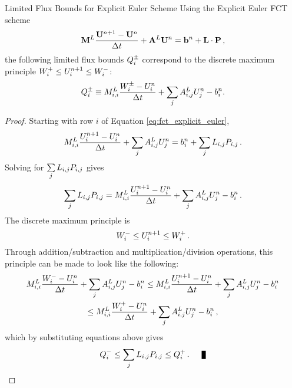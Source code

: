 \begin{theorem}{Limited Flux Bounds for Explicit Euler Scheme}
   Using the Explicit Euler FCT scheme
   \begin{equation}
     \lumpedmassmatrix\frac{\solutionvector^{\timeindex+1}
       - \solutionvector^\timeindex}{\timestepsize}
       + \loworderssmatrix\solutionvector^\timeindex
       = \ssrhs^\timeindex + \limitedfluxsum \eqc
   \end{equation}
   the following limited flux bounds $Q_i^\pm$ correspond to the
   discrete maximum principle
   $W_i^+\le U_i^{n+1}\le W_i^-$:
   \begin{equation}\label{eq:limited_flux_bounds_explicit_euler}
     Q_i^\pm \equiv M^L_{i,i}
       \frac{W_i^\pm-U_i^n}{\Delta t}
     + \sum\limits_j A_{i,j}^L U_j^n
     - b_i^n.
   \end{equation}
\end{theorem}

\begin{proof}
   Starting with row $i$ of Equation \eqref{eq:fct_explicit_euler},
   \[
     \lumpedmassentry\frac{\solutionletter_i^{\timeindex+1}
       - \solutionletter_i^\timeindex}{\timestepsize}
     + \sumj \ssmatrixletter\ij^L \solutionletter_j^\timeindex
     = \ssrhsletter_i^\timeindex
       + \sumj \limiterletter\ij\MakeUppercase{\correctionfluxletter}\ij \eqp
   \]
   Solving for $\limitedfluxsumi$ gives
   \[
     \limitedfluxsumi = \lumpedmassentry
       \frac{\solutionletter_i^{\timeindex+1}-\solutionletter_i^\timeindex}
       {\timestepsize}
     + \sumj \ssmatrixletter\ij^L \solutionletter_j^\timeindex
     - \ssrhsletter_i^\timeindex \eqp
   \]
   The discrete maximum principle is
   \[
     W_i^-\le U_i^{n+1}\le W_i^+ \,.
   \]
   Through addition/subtraction and multiplication/division operations, this
   principle can be made to look like the following:
   \begin{multline*}
     M^L_{i,i}\frac{W_i^- -U_i^n}
       {\Delta t}
     + \sum\limits_j A_{i,j}^L U_j^n
     - b_i^n
     \le M^L_{i,i}\frac{U_i^{n+1}
       - U_i^n}{\Delta t}
     + \sum\limits_j A_{i,j}^L U_j^n
     - b_i^n
     \\\le M^L_{i,i}\frac{W_i^+
       - U_i^n}{\Delta t}
     + \sum\limits_j A_{i,j}^L U_j^n
     - b_i^n \,,
   \end{multline*}
   which by substituting equations above gives
   \[
      \limitedfluxbound_i^-\le\limitedfluxsumi\le \limitedfluxbound_i^+\eqp\qed
   \]
\end{proof}
